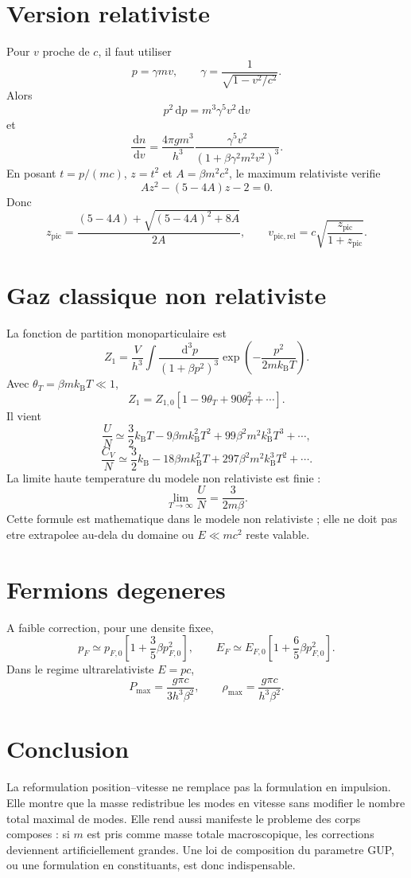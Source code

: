 \documentclass[11pt,a4paper]{article}
\newcommand{\dd}{\,\mathrm{d}}
\newcommand{\kb}{k_{\mathrm B}}
\begin{document}
\section{Version relativiste}

Pour $v$ proche de $c$, il faut utiliser
\[
p=\gamma mv,
\qquad
\gamma=\frac{1}{\sqrt{1-v^2/c^2}}.
\]
Alors
\[
p^2\dd p=m^3\gamma^5v^2\dd v
\]
et
\[
\frac{\dd n}{\dd v}
=
\frac{4\pi g m^3}{h^3}
\frac{\gamma^5v^2}{(1+\beta\gamma^2m^2v^2)^3}.
\]
En posant $t=p/(mc)$, $z=t^2$ et $A=\beta m^2c^2$, le maximum relativiste verifie
\[
A z^2-(5-4A)z-2=0.
\]
Donc
\[
z_{\mathrm{pic}}=
\frac{(5-4A)+\sqrt{(5-4A)^2+8A}}{2A},
\qquad
v_{\mathrm{pic,rel}}=
c\sqrt{\frac{z_{\mathrm{pic}}}{1+z_{\mathrm{pic}}}}.
\]

\section{Gaz classique non relativiste}

La fonction de partition monoparticulaire est
\[
Z_1=
\frac{V}{h^3}
\int
\frac{\dd^3p}{(1+\beta p^2)^3}
\exp\left(-\frac{p^2}{2m\kb T}\right).
\]
Avec $\theta_T=\beta m\kb T\ll1$,
\[
Z_1=Z_{1,0}\left[1-9\theta_T+90\theta_T^2+\cdots\right].
\]
Il vient
\[
\frac{U}{N}
\simeq
\frac32\kb T
-9\beta m\kb^2T^2
+99\beta^2m^2\kb^3T^3+\cdots,
\]
\[
\frac{C_V}{N}
\simeq
\frac32\kb
-18\beta m\kb^2T
+297\beta^2m^2\kb^3T^2+\cdots.
\]
La limite haute temperature du modele non relativiste est finie :
\[
\lim_{T\to\infty}\frac{U}{N}
=
\frac{3}{2m\beta}.
\]
Cette formule est mathematique dans le modele non relativiste ; elle ne doit pas etre extrapolee au-dela du domaine ou $E\ll mc^2$ reste valable.

\section{Fermions degeneres}

A faible correction, pour une densite fixee,
\[
p_F\simeq p_{F,0}
\left[1+\frac35\beta p_{F,0}^2\right],
\qquad
E_F\simeq E_{F,0}
\left[1+\frac65\beta p_{F,0}^2\right].
\]
Dans le regime ultrarelativiste $E=pc$,
\[
P_{\max}=\frac{g\pi c}{3h^3\beta^2},
\qquad
\rho_{\max}=\frac{g\pi c}{h^3\beta^2}.
\]

\section{Conclusion}

La reformulation position--vitesse ne remplace pas la formulation en impulsion. Elle montre que la masse redistribue les modes en vitesse sans modifier le nombre total maximal de modes. Elle rend aussi manifeste le probleme des corps composes : si $m$ est pris comme masse totale macroscopique, les corrections deviennent artificiellement grandes. Une loi de composition du parametre GUP, ou une formulation en constituants, est donc indispensable.
\end{document}
